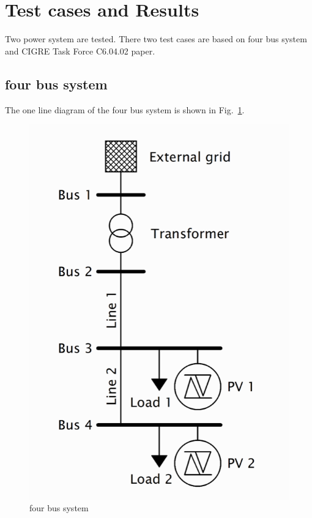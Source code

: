 \section{Test cases and Results}

  Two power system are tested. There two test cases are based on four bus system and CIGRE Task Force C6.04.02 paper\cite{b3}.

  \subsection{four bus system}
    The one line diagram of the four bus system is shown in Fig.~\ref{fig.4_bus_system}.

    \begin{figure}[H]
      \center
      \includegraphics[scale=0.5]{images/four_bus_system.png}
      \caption{four bus system}
      \label{fig.4_bus_system}
    \end{figure}

